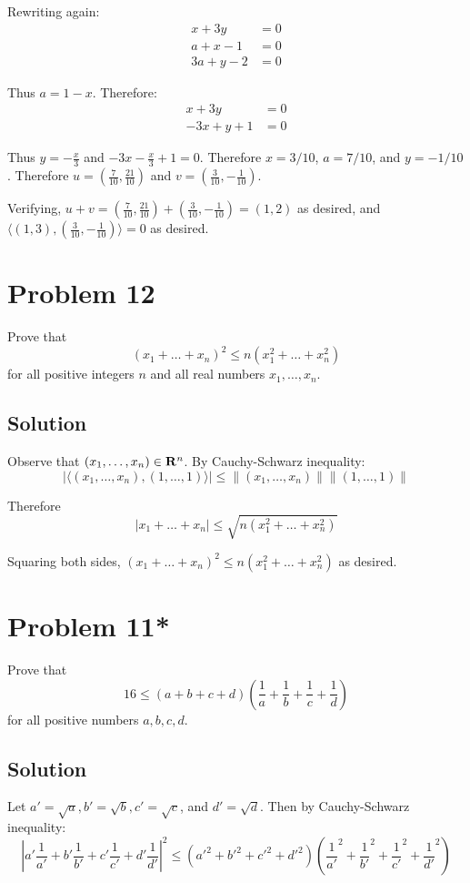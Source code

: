 \documentclass{article}
\begin{document}
Rewriting again:
\begin{align*}
    x+3y&=0\\
    a+x-1&=0\\
    3a+y-2&=0
\end{align*}

Thus $a=1-x$. Therefore:
\begin{align*}
    x+3y&=0\\
    -3x+y+1&=0
\end{align*}

Thus $y=-\frac{x}{3}$ and $-3x-\frac{x}{3}+1=0$. Therefore $x=3/10$, $a=7/10$, and $y=-1/10$. Therefore $u=(\frac{7}{10}, \frac{21}{10})$ and $v=(\frac{3}{10}, -\frac{1}{10})$.

\vs

Verifying, $u+v=(\frac{7}{10}, \frac{21}{10})+(\frac{3}{10}, -\frac{1}{10})=(1, 2)$ as desired, and $\langle (1,3), (\frac{3}{10}, -\frac{1}{10})\rangle=0$ as desired.

\section*{Problem 12}
Prove that
\[(x_1+\ldots+x_n)^2\leq n(x_1^2+\ldots+x_n^2)\]
for all positive integers $n$ and all real numbers $x_1,\ldots,x_n$.

\subsection*{Solution}
Observe that $(x_1,\ldots,x_n)\in\mathbf{R}^n$. By Cauchy-Schwarz inequality:
\[|\langle(x_1,\ldots,x_n),(1,\ldots,1)\rangle|\leq\|(x_1,\ldots,x_n)\|\|(1,\ldots,1)\|\]

Therefore
\[|x_1+\ldots+x_n|\leq \sqrt{n(x_1^2+\ldots+x_n^2)}\]

Squaring both sides, $(x_1+\ldots+x_n)^2\leq n(x_1^2+\ldots+x_n^2)$ as desired.

\section*{Problem 11*}
Prove that
\[16\leq(a+b+c+d)\left(\frac{1}{a}+\frac{1}{b}+\frac{1}{c}+\frac{1}{d}\right)\]
for all positive numbers $a,b,c,d$.

\subsection*{Solution}
Let $a'=\sqrt{a}, b'=\sqrt{b}, c'=\sqrt{c}$, and $d'=\sqrt{d}$. Then by Cauchy-Schwarz inequality:
\[|a'\frac{1}{a'}+b'\frac{1}{b'}+c'\frac{1}{c'}+d'\frac{1}{d'}|^2\leq(a'^2+b'^2+c'^2+d'^2)(\frac{1}{a'}^2+\frac{1}{b'}^2+\frac{1}{c'}^2+\frac{1}{d'}^2)\]
\end{document}
